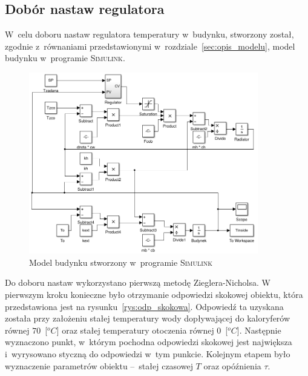 \documentclass[12pt, a4paper]{article}
\begin{document}
    \subsection{Dobór nastaw regulatora}
    \label{sec:dobor_nastaw}
    \indent
    
    W~celu doboru nastaw regulatora temperatury w~budynku, stworzony został,
    zgodnie z~równaniami przedstawionymi w~rozdziale~\ref{sec:opis_modelu},
    model budynku w~programie \textsc{Simulink}.
    
    \begin{figure}[!ht]
    	\centering
    	\includegraphics[width=10cm]{../img/model_simulink.png}
    	\caption{Model budynku stworzony w~programie \textsc{Simulink}}
    	\label{rys:model_simulink}
    \end{figure}
    
    Do doboru nastaw wykorzystano pierwszą metodę Zieglera-Nicholsa. W
    pierwszym kroku konieczne było otrzymanie odpowiedzi skokowej obiektu, która
    przedstawiona jest na rysunku~\ref{rys:odp_skokowa}. Odpowiedź ta uzyskana
    została przy założeniu stałej temperatury wody dopływającej do kaloryferów
    równej $70$~[$^oC$] oraz stałej temperatury otoczenia równej $0$~[$^oC$].
    Następnie wyznaczono punkt, w~którym pochodna odpowiedzi skokowej jest
    największa i~wyrysowano styczną do odpowiedzi w~tym punkcie. Kolejnym etapem
    było wyznaczenie parametrów obiektu --~stałej czasowej $T$ oraz opóźnienia
    $\tau$.
    
\end{document}
